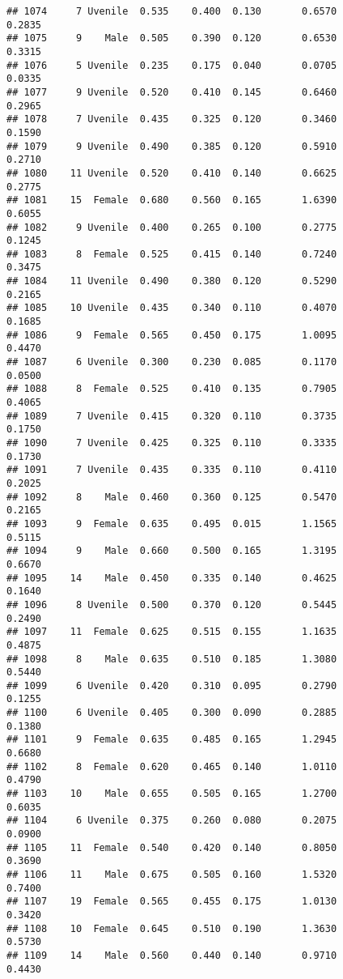 \documentclass[
]{article}
\begin{document}
\begin{verbatim}
## 1074     7 Uvenile  0.535    0.400  0.130       0.6570         0.2835
## 1075     9    Male  0.505    0.390  0.120       0.6530         0.3315
## 1076     5 Uvenile  0.235    0.175  0.040       0.0705         0.0335
## 1077     9 Uvenile  0.520    0.410  0.145       0.6460         0.2965
## 1078     7 Uvenile  0.435    0.325  0.120       0.3460         0.1590
## 1079     9 Uvenile  0.490    0.385  0.120       0.5910         0.2710
## 1080    11 Uvenile  0.520    0.410  0.140       0.6625         0.2775
## 1081    15  Female  0.680    0.560  0.165       1.6390         0.6055
## 1082     9 Uvenile  0.400    0.265  0.100       0.2775         0.1245
## 1083     8  Female  0.525    0.415  0.140       0.7240         0.3475
## 1084    11 Uvenile  0.490    0.380  0.120       0.5290         0.2165
## 1085    10 Uvenile  0.435    0.340  0.110       0.4070         0.1685
## 1086     9  Female  0.565    0.450  0.175       1.0095         0.4470
## 1087     6 Uvenile  0.300    0.230  0.085       0.1170         0.0500
## 1088     8  Female  0.525    0.410  0.135       0.7905         0.4065
## 1089     7 Uvenile  0.415    0.320  0.110       0.3735         0.1750
## 1090     7 Uvenile  0.425    0.325  0.110       0.3335         0.1730
## 1091     7 Uvenile  0.435    0.335  0.110       0.4110         0.2025
## 1092     8    Male  0.460    0.360  0.125       0.5470         0.2165
## 1093     9  Female  0.635    0.495  0.015       1.1565         0.5115
## 1094     9    Male  0.660    0.500  0.165       1.3195         0.6670
## 1095    14    Male  0.450    0.335  0.140       0.4625         0.1640
## 1096     8 Uvenile  0.500    0.370  0.120       0.5445         0.2490
## 1097    11  Female  0.625    0.515  0.155       1.1635         0.4875
## 1098     8    Male  0.635    0.510  0.185       1.3080         0.5440
## 1099     6 Uvenile  0.420    0.310  0.095       0.2790         0.1255
## 1100     6 Uvenile  0.405    0.300  0.090       0.2885         0.1380
## 1101     9  Female  0.635    0.485  0.165       1.2945         0.6680
## 1102     8  Female  0.620    0.465  0.140       1.0110         0.4790
## 1103    10    Male  0.655    0.505  0.165       1.2700         0.6035
## 1104     6 Uvenile  0.375    0.260  0.080       0.2075         0.0900
## 1105    11  Female  0.540    0.420  0.140       0.8050         0.3690
## 1106    11    Male  0.675    0.505  0.160       1.5320         0.7400
## 1107    19  Female  0.565    0.455  0.175       1.0130         0.3420
## 1108    10  Female  0.645    0.510  0.190       1.3630         0.5730
## 1109    14    Male  0.560    0.440  0.140       0.9710         0.4430

\end{verbatim}
\end{document}
